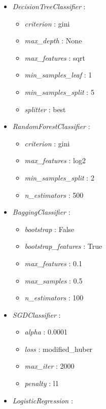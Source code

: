 \documentclass{article}
\begin{document}
\begin{footnotesize}
\begin{multicols}{2}
\begin{itemize}
    \item \textit{DecisionTreeClassifier} :
    \begin{itemize}
        \item \textit{criterion} : gini
        \item \textit{max\_depth} : None
        \item \textit{max\_features} : sqrt
        \item \textit{min\_samples\_leaf} : 1
        \item \textit{min\_samples\_split} : 5
        \item \textit{splitter} : best
    \end{itemize}
    \item \textit{RandomForestClassifier} :
    \begin{itemize}
        \item \textit{criterion} : gini
        \item \textit{max\_features} : log2
        \item \textit{min\_samples\_split} : 2
        \item \textit{n\_estimators} : 500
    \end{itemize}
    \item \textit{BaggingClassifier} :
    \begin{itemize}
        \item \textit{bootstrap} : False
        \item \textit{bootstrap\_features} : True
        \item \textit{max\_features} : 0.1
        \item \textit{max\_samples} : 0.5
        \item \textit{n\_estimators} : 100
    \end{itemize}
    \item \textit{SGDClassifier} :
    \begin{itemize}
        \item \textit{alpha} : 0.0001
        \item \textit{loss} : modified\_huber
        \item \textit{max\_iter} : 2000
        \item \textit{penalty} : l1
    \end{itemize}
    \item \textit{LogisticRegression} :

\end{itemize}
\end{multicols}
\end{footnotesize}
\end{document}
